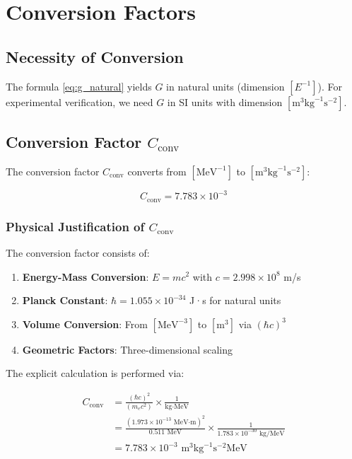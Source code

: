 \documentclass[12pt,a4paper]{article}
\newcommand{\Cconv}{C_{\text{conv}}}
\begin{document}
	\section{Conversion Factors}
	
	\subsection{Necessity of Conversion}
	
	The formula \eqref{eq:g_natural} yields $G$ in natural units (dimension $[E^{-1}]$). For experimental verification, we need $G$ in SI units with dimension $[\text{m}^3 \text{kg}^{-1} \text{s}^{-2}]$.
	
	\subsection{Conversion Factor $\Cconv$}
	
	The conversion factor $\Cconv$ converts from $[\text{MeV}^{-1}]$ to $[\text{m}^3 \text{kg}^{-1} \text{s}^{-2}]$:
	
	\begin{equation}
		\Cconv = 7.783 \times 10^{-3}
	\end{equation}
	
	\subsubsection{Physical Justification of $\Cconv$}
	
	The conversion factor consists of:
	
	\begin{enumerate}
		\item \textbf{Energy-Mass Conversion}: $E = mc^2$ with $c = 2.998 \times 10^8$ m/s
		\item \textbf{Planck Constant}: $\hbar = 1.055 \times 10^{-34}$ J·s for natural units
		\item \textbf{Volume Conversion}: From $[\text{MeV}^{-3}]$ to $[\text{m}^3]$ via $(\hbar c)^3$
		\item \textbf{Geometric Factors}: Three-dimensional scaling
	\end{enumerate}
	
	The explicit calculation is performed via:
	
	\begin{align}
		\Cconv &= \frac{(\hbar c)^2}{(m_e c^2)} \times \frac{1}{\text{kg} \cdot \text{MeV}} \\
		&= \frac{(1.973 \times 10^{-13} \text{ MeV·m})^2}{0.511 \text{ MeV}} \times \frac{1}{1.783 \times 10^{-30} \text{ kg/MeV}} \\
		&= 7.783 \times 10^{-3} \text{ m}^3 \text{kg}^{-1} \text{s}^{-2} \text{MeV}
	\end{align}
	
\end{document}
